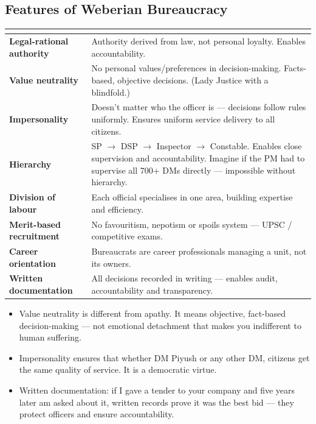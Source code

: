 \subsection*{Features of Weberian Bureaucracy}

\begin{tabularx}{\textwidth}{@{}>{\bfseries\color{Accent}}p{3.4cm} Y@{}}
\toprule
{} &  \\
\midrule
Legal-rational authority & Authority derived from law, not personal loyalty. Enables accountability. \\
Value neutrality & No personal values/preferences in decision-making. Facts-based, objective decisions. (Lady Justice with a blindfold.) \\
Impersonality & Doesn't matter who the officer is --- decisions follow rules uniformly. Ensures uniform service delivery to all citizens. \\
Hierarchy & SP $\rightarrow$ DSP $\rightarrow$ Inspector $\rightarrow$ Constable. Enables close supervision and accountability. Imagine if the PM had to supervise all 700+ DMs directly --- impossible without hierarchy. \\
Division of labour & Each official specialises in one area, building expertise and efficiency. \\
Merit-based recruitment & No favouritism, nepotism or spoils system --- UPSC / competitive exams. \\
Career orientation & Bureaucrats are career professionals managing a unit, not its owners. \\
Written documentation & All decisions recorded in writing --- enables audit, accountability and transparency. \\
\bottomrule
\end{tabularx}

\begin{CriticalPoint}
\begin{itemize}
\item Value neutrality is different from apathy. It means objective, fact-based decision-making --- not emotional detachment that makes you indifferent to human suffering.
\item Impersonality ensures that whether DM Piyush or any other DM, citizens get the same quality of service. It is a democratic virtue.
\item Written documentation: if I gave a tender to your company and five years later am asked about it, written records prove it was the best bid --- they protect officers and ensure accountability.
\end{itemize}
\end{CriticalPoint}

